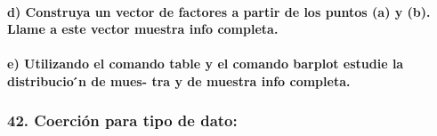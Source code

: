 \documentclass[
]{article}
\newenvironment{Shaded}{\begin{snugshade}}{\end{snugshade}}
\begin{document}
\hypertarget{d-construya-un-vector-de-factores-a-partir-de-los-puntos-a-y-b.-llame-a-este-vector-muestra-info-completa.}{%
\paragraph{d) Construya un vector de factores a partir de los puntos (a)
y (b). Llame a este vector muestra info
completa.}\label{d-construya-un-vector-de-factores-a-partir-de-los-puntos-a-y-b.-llame-a-este-vector-muestra-info-completa.}}

\hypertarget{e-utilizando-el-comando-table-y-el-comando-barplot-estudie-la-distribucio-n-de-mues--tra-y-de-muestra-info-completa.}{%
\paragraph{e) Utilizando el comando table y el comando barplot estudie
la distribucio ́n de mues- tra y de muestra info
completa.}\label{e-utilizando-el-comando-table-y-el-comando-barplot-estudie-la-distribucio-n-de-mues--tra-y-de-muestra-info-completa.}}

\begin{Shaded}
\begin{Highlighting}[]

\end{Highlighting}
\end{Shaded}

\hypertarget{coerciuxf3n-para-tipo-de-dato}{%
\subsubsection{42. Coerción para tipo de
dato:}\label{coerciuxf3n-para-tipo-de-dato}}
\end{document}
